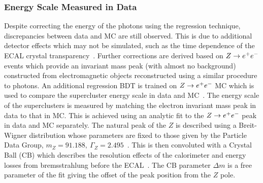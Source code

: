 \subsubsection{Energy Scale Measured in Data}
Despite correcting the energy of the photons using the regression technique, discrepancies between data and
MC are still observed. This is due to additional detector effects which may not be simulated, such as the
time dependence of the ECAL crystal transparency~\citep{CMS-DP-2012-007}. Further corrections are
derived based on $Z\rightarrow e^{+}e^{-}$ events which provide an invariant mass peak (with almost no background) constructed from 
electromagnetic objects reconstructed using a similar procedure to photons.
An additional regression BDT is trained on $Z\rightarrow e^{+}e^{-}$ MC which is used
to compare the supercluster energy scale in data and MC~\citep{AN-12-048}.
The energy scale of the superclusters is measured by matching the electron
invariant mass peak in data to that in MC. This is achieved using an analytic fit to the $Z\rightarrow e^{+}e^{-}$ peak in data and MC
separately. The natural peak of the $Z$ is described using a Breit-Wigner distribution whose parameters are fixed
to those given by the Particle Data Group, $m_{Z}=91.188,~\Gamma_{Z} = 2.495$~\citep{pdg}. This is then convoluted 
with a Crystal Ball (CB) which describes the resolution effects of the calorimeter and energy losses from 
bremsstrahlung before the ECAL~\citep{crystalball}. 
The CB parameter $\Delta m$ is a free parameter of the fit giving the 
offset of the peak position from the $Z$ pole. 

